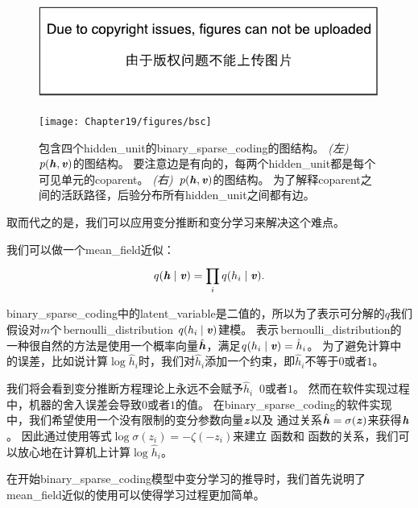 \begin{figure}[!htb]
\ifOpenSource
\centerline{\includegraphics{figure.pdf}}
\else
	\centerline{\texttt{[image: Chapter19/figures/bsc]}}
\fi
\caption{包含四个\gls{hidden_unit}的\gls{binary_sparse_coding}的图结构。
\emph{(左)}~$p(\boldsymbol{\mathit{h}},\boldsymbol{\mathit{v}})$的图结构。
要注意边是有向的，每两个\gls{hidden_unit}都是每个可见单元的\gls{coparent}。
\emph{(右)}~$p(\boldsymbol{\mathit{h}},\boldsymbol{\mathit{v}})$的图结构。
为了解释\gls{coparent}之间的活跃路径，后验分布所有\gls{hidden_unit}之间都有边。}
	\label{fig:bsc}
\end{figure}



取而代之的是，我们可以应用变分推断和变分学习来解决这个难点。


我们可以做一个\gls{mean_field}近似：
\begin{align}
	q(\boldsymbol{\mathit{h}}\mid\boldsymbol{\mathit{v}}) = \prod_{i}^{}q(h_i\mid\boldsymbol{\mathit{v}}).
\end{align}


\gls{binary_sparse_coding}中的\gls{latent_variable}是二值的，所以为了表示可分解的$q$我们假设对$m$个\,\gls{bernoulli_distribution} $q(h_i\mid\boldsymbol{\mathit{v}})$建模。
表示\,\gls{bernoulli_distribution}的一种很自然的方法是使用一个概率向量$\hat{\boldsymbol{\mathit{h}}}$，满足$q(h_i\mid\boldsymbol{\mathit{v}}) = \hat{h}_i$。
为了避免计算中的误差，比如说计算$\log \hat{h}_i$时，我们对$\hat{h}_i$添加一个约束，即$\hat{h}_i$不等于$0$或者$1$。


我们将会看到变分推断方程理论上永远不会赋予$\hat{h}_i\ $ $0$或者$1$。
然而在软件实现过程中，机器的舍入误差会导致$0$或者$1$的值。
在\gls{binary_sparse_coding}的软件实现中，我们希望使用一个没有限制的变分参数向量$\boldsymbol{\mathit{z}}$以及
通过关系$\hat{\boldsymbol{\mathit{h}}} = \sigma(\boldsymbol{\mathit{z}})$来获得$\boldsymbol{\mathit{h}}$。
因此通过使用等式$\log \sigma(z_i) = -\zeta(-z_i)$来建立\,\,函数和\,\,函数的关系，我们可以放心地在计算机上计算$\log \hat{h}_i$。


在开始\gls{binary_sparse_coding}模型中变分学习的推导时，我们首先说明了\gls{mean_field}近似的使用可以使得学习过程更加简单。


